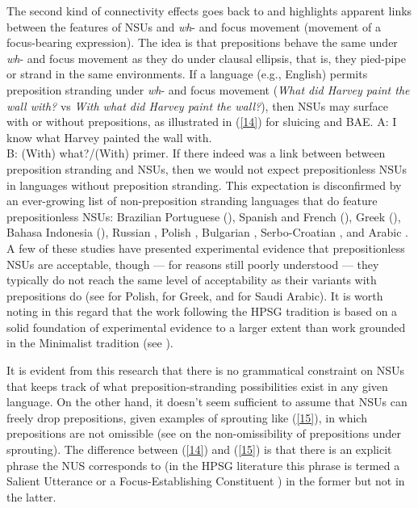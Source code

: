 {The second kind of connectivity effects goes back to \citet{Merchant2001, Merchant2005a} and highlights apparent links between the features of NSUs and \emph{wh}- and focus movement (movement of a focus-bearing expression). The idea is that prepositions behave the same under \emph{wh}- and focus movement as they do under clausal ellipsis, that is, they pied-pipe or strand in the same environments. If a language (e.g., English) permits preposition stranding under \emph{wh}- and focus movement (\emph{What did Harvey paint the wall with?} vs \emph{With what did Harvey paint the wall?}), then NSUs may surface with or without prepositions, as illustrated in (\ref{14}) for sluicing and BAE.
%
\ea A: I know what Harvey painted the wall with.\\B: (With) what?/(With) primer.\label{14}\z
%
If there indeed was a link between between preposition stranding and NSUs, then we would not expect prepositionless NSUs in languages without preposition stranding. This expectation is disconfirmed by an ever-growing list of non-preposition stranding languages that do feature prepositionless NSUs: Brazilian Portuguese (\citealt{AlmeidaYoshida2007}), Spanish and French (\citealt{Rodrigues2006}), Greek (\citealt{Molimpakis2018}), Bahasa Indonesia (\citealt{Fortin2007}), %
 Russian \citep{Philippova2014}, Polish \citep{Szczegielniak2008, Sag2011, Nykiel2013}, %
Bulgarian \citep{Abels2017}, Serbo-Croatian \citep{Stjepanovic2008, Stjepanovic2012}, and %
Arabic \citep{Leung2014, Alshaalan2020}. A few of these studies have presented experimental evidence that prepositionless NSUs are acceptable, though --- for reasons still poorly understood --- they typically do not reach the same level of acceptability as their variants with prepositions do (see \citealt{Nykiel2013} for Polish, \citealt{Molimpakis2018} for Greek, and \citealt{Alshaalan2020} for Saudi Arabic). It is worth noting in this regard that the work following the HPSG tradition is based on a solid foundation of experimental evidence to a larger extent than work grounded in the Minimalist tradition (see \citealt{Sag2011, Miller2014}).

It is evident from this research that there is no grammatical constraint on NSUs that keeps track of what preposition-stranding possibilities exist in any given language. On the other hand, it doesn't seem sufficient to assume that NSUs can freely drop prepositions, given examples of sprouting like (\ref{15}), in which prepositions are not omissible (see \citealt{Chung1995} on the non-omissibility of prepositions under sprouting). The difference between (\ref{14}) and (\ref{15}) is that there is an explicit phrase the NUS corresponds to (in the HPSG literature this phrase is termed a Salient Utterance \citep[313]{Ginzburg:Sag:2000} or a Focus-Establishing Constituent \citealt{Ginzburg2012}) in the former but not in the latter.

}
